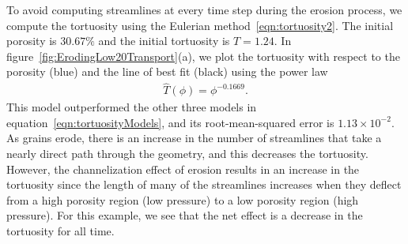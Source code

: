 \documentclass{jfm}
\begin{document}
To avoid computing streamlines at every time step during the erosion
process, we compute the tortuosity using the Eulerian
method~\eqref{eqn:tortuosity2}.  The initial porosity is $30.67\%$ and
the initial tortuosity is $T = 1.24$.  In
figure~\ref{fig:ErodingLow20Transport}(a), we plot the tortuosity with
respect to the porosity (blue) and the line of best fit (black) using
the power law 
\begin{align}
  \widehat{T}(\phi) = \phi^{-0.1669}.
\end{align}
This model outperformed the other three models in
equation~\eqref{eqn:tortuosityModels}, and its root-mean-squared error
is $1.13 \times 10^{-2}$.  As grains erode, there is an increase in the
number of streamlines that take a nearly direct path through the
geometry, and this decreases the tortuosity. However, the channelization
effect of erosion results in an increase in the tortuosity since the
length of many of the streamlines increases when they deflect from a
high porosity region (low pressure) to a low porosity region (high
pressure). For this example, we see that the net effect is a decrease in
the tortuosity for all time.
\end{document}
